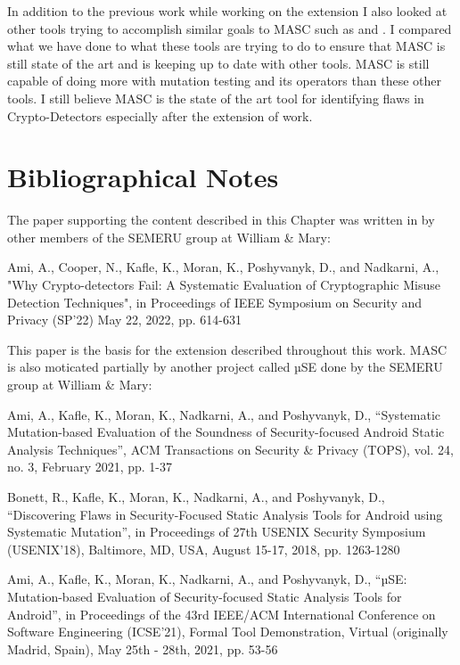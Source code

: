 In addition to the previous work while working on the extension I also looked at other tools trying to accomplish similar goals to MASC such as \cite{Afrose_Xiao_Rahaman_Miller_Yao_2022} and \cite{Schlichtig_Wickert_Krüger_Bodden_Mezini_2022}. I compared what we have done to what these tools are trying to do to ensure that MASC is still state of the art and is keeping up to date with other tools. MASC is still capable of doing more with mutation testing and its operators than these other tools. I still believe MASC is the state of the art tool for identifying flaws in Crypto-Detectors especially after the extension of work.






\section{Bibliographical Notes}
\label{ch1:sec:bibliographicalNotes}

The paper supporting the content described in this Chapter was written in by other members of the SEMERU group at William \& Mary:

Ami, A., Cooper, N., Kafle, K., Moran, K., Poshyvanyk, D., and Nadkarni, A., "Why Crypto-detectors Fail: A Systematic Evaluation of Cryptographic Misuse Detection Techniques", in Proceedings of IEEE Symposium on Security and Privacy (SP'22) May 22, 2022, pp. 614-631

This paper is the basis for the extension described throughout this work. MASC is also moticated partially by another project called µSE done by the SEMERU group at William \& Mary:

Ami, A., Kafle, K., Moran, K., Nadkarni, A., and Poshyvanyk, D., “Systematic Mutation-based Evaluation of the Soundness of Security-focused Android Static Analysis Techniques”, ACM Transactions on Security \& Privacy (TOPS), vol. 24, no. 3, February 2021, pp. 1-37

Bonett, R., Kafle, K., Moran, K., Nadkarni, A., and Poshyvanyk, D., “Discovering Flaws in Security-Focused Static Analysis Tools for Android using Systematic Mutation”, in Proceedings of 27th USENIX Security Symposium (USENIX’18), Baltimore, MD, USA, August 15-17, 2018, pp. 1263-1280

Ami, A., Kafle, K., Moran, K., Nadkarni, A., and Poshyvanyk, D., “µSE: Mutation-based Evaluation of Security-focused Static Analysis Tools for Android”, in Proceedings of the 43rd IEEE/ACM International Conference on Software Engineering (ICSE’21), Formal Tool Demonstration, Virtual (originally Madrid, Spain), May 25th - 28th, 2021, pp. 53-56